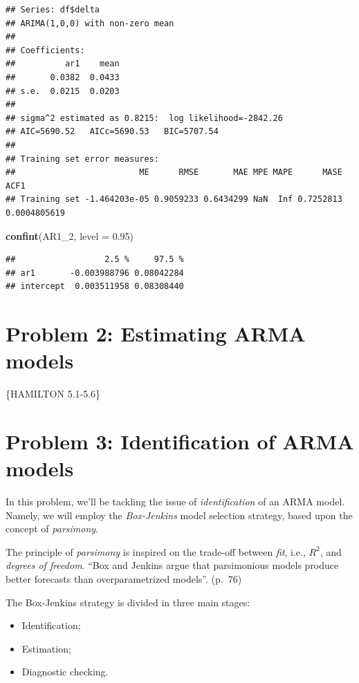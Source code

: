 \documentclass[11pt, a4paper]{report}
\newenvironment{Shaded}{\begin{snugshade}}{\end{snugshade}}
\newcommand{\DataTypeTok}[1]{\textcolor[rgb]{0.13,0.29,0.53}{#1}}
\newcommand{\DecValTok}[1]{\textcolor[rgb]{0.00,0.00,0.81}{#1}}
\newcommand{\FloatTok}[1]{\textcolor[rgb]{0.00,0.00,0.81}{#1}}
\newcommand{\KeywordTok}[1]{\textcolor[rgb]{0.13,0.29,0.53}{\textbf{#1}}}
\newcommand{\NormalTok}[1]{#1}
\theoremstyle{plain}
\theoremstyle{plain}
\theoremstyle{remark}
\begin{document}
\begin{verbatim}
## Series: df$delta 
## ARIMA(1,0,0) with non-zero mean 
## 
## Coefficients:
##          ar1    mean
##       0.0382  0.0433
## s.e.  0.0215  0.0203
## 
## sigma^2 estimated as 0.8215:  log likelihood=-2842.26
## AIC=5690.52   AICc=5690.53   BIC=5707.54
## 
## Training set error measures:
##                         ME      RMSE       MAE MPE MAPE      MASE         ACF1
## Training set -1.464203e-05 0.9059233 0.6434299 NaN  Inf 0.7252813 0.0004805619
\end{verbatim}

\begin{Shaded}
\begin{Highlighting}[]
\KeywordTok{confint}\NormalTok{(AR1_}\DecValTok{2}\NormalTok{, }\DataTypeTok{level =} \FloatTok{0.95}\NormalTok{)}
\end{Highlighting}
\end{Shaded}

\begin{verbatim}
##                  2.5 %     97.5 %
## ar1       -0.003988796 0.08042284
## intercept  0.003511958 0.08308440
\end{verbatim}


\chapter{Problem 2: Estimating ARMA models}

\{HAMILTON 5.1-5.6\}


\chapter{Problem 3: Identification of ARMA models}

In this problem, we'll be tackling the issue of \emph{identification} of
an ARMA model. Namely, we will employ the \emph{Box-Jenkins} model
selection strategy, based upon the concept of \emph{parsimony}.

The principle of \emph{parsimony} is inspired on the trade-off between
\emph{fit}, i.e., \(R^2\), and \emph{degrees of freedom}. ``Box and
Jenkins argue that parsimonious models produce better forecasts than
overparametrized models''. (p.~76)

The Box-Jenkins strategy is divided in three main stages:

\begin{itemize}
	\item Identification;
	\item Estimation;
	\item Diagnostic checking.
\end{itemize}
\end{document}
